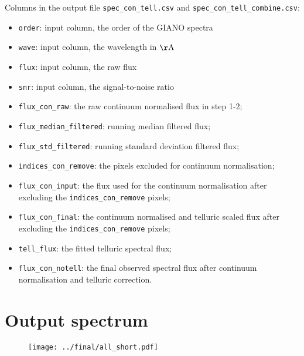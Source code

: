\documentclass{article}
\begin{document}
Columns in the output file \texttt{spec\_con\_tell.csv} and \texttt{spec\_con\_tell\_combine.csv}:
\begin{itemize}
    \item \texttt{order}: input column, the order of the GIANO spectra
    \item \texttt{wave}: input column, the wavelength in $\mathrm{\AA}$
    \item \texttt{flux}: input column, the raw flux
    \item \texttt{snr}: input column, the signal-to-noise ratio
    \item \texttt{flux\_con\_raw}: the raw continuum normalised flux in step 1-2;
    \item \texttt{flux\_median\_filtered}: running median filtered flux;
    \item \texttt{flux\_std\_filtered}: running standard deviation filtered flux;
    \item \texttt{indices\_con\_remove}: the pixels excluded for continuum normalisation;
    \item \texttt{flux\_con\_input}: the flux used for the continuum normalisation after excluding the \texttt{indices\_con\_remove} pixels;
    \item \texttt{flux\_con\_final}: the continuum normalised and telluric scaled flux after excluding the \texttt{indices\_con\_remove} pixels;
    \item \texttt{tell\_flux}: the fitted telluric spectral flux;
    \item \texttt{flux\_con\_notell}: the final observed spectral flux after continuum normalisation and telluric correction.
\end{itemize}

\section{Output spectrum}

\begin{figure}[H]
    \centering
    \texttt{[image: ../final/all\_short.pdf]}
\end{figure}
\end{document}
